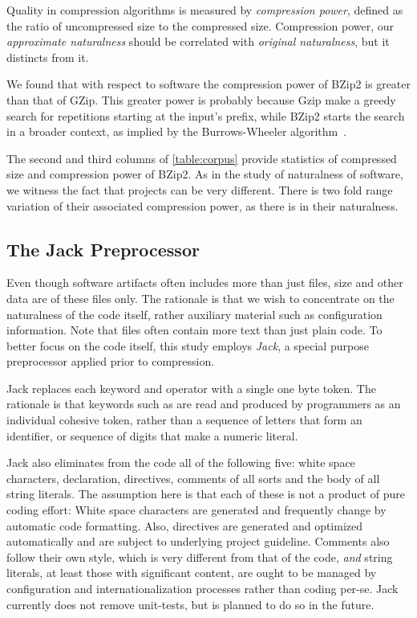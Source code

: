 Quality in compression algorithms is measured by \emph{compression power},
defined as the ratio of uncompressed size to the compressed size. Compression
power, our \emph{approximate naturalness} should be correlated with
\emph{original naturalness}, but it distincts from it.

We found that with respect to \Java software the compression power of BZip2
is greater than that of GZip. This greater power is probably because Gzip make a
greedy search for repetitions starting at the input's prefix, while BZip2
starts the search in a broader context, as implied by the Burrows-Wheeler
algorithm~\cite{Burrows:Wheeler:94}.

The second and third columns of \cref{table:corpus} provide statistics of
compressed size and compression power of BZip2. As in
the study of naturalness of software, we witness the fact that projects can be
very different. There is two fold range variation of their associated
compression power, as there is in their naturalness.

\subsection{The Jack Preprocessor}

Even though software artifacts often includes more than just  files,
size and other data are of these files only. The rationale is that we wish to
concentrate on the naturalness of the \Java code itself, rather auxiliary
material such as configuration information. 
Note that  files often contain more text than just plain code.  To
better focus on the code itself, this study employs \emph{Jack}, a special
purpose \Java preprocessor applied prior to compression.

Jack replaces each keyword and operator with a single one byte token. The
rationale is that keywords such as  are read and produced by
programmers as an individual cohesive token, rather than a sequence of letters
that form an identifier, or sequence of digits that make a numeric literal.

Jack also eliminates from the \Java code all of the following five: white space
characters,  declaration,  directives, comments of all
sorts and the body of all string literals. The assumption here is that each
of these is not a product of pure coding effort: White space characters are
generated and frequently change by automatic code formatting. Also, 
directives are generated and optimized automatically and are subject to
underlying project guideline. Comments also follow their own style, which is
very different from that of the code, \emph{and} string literals, at least
those with significant content, are ought to be managed by configuration and
internationalization processes rather than coding per-se.
Jack currently does not remove unit-tests, but is planned to do so in the
future.

